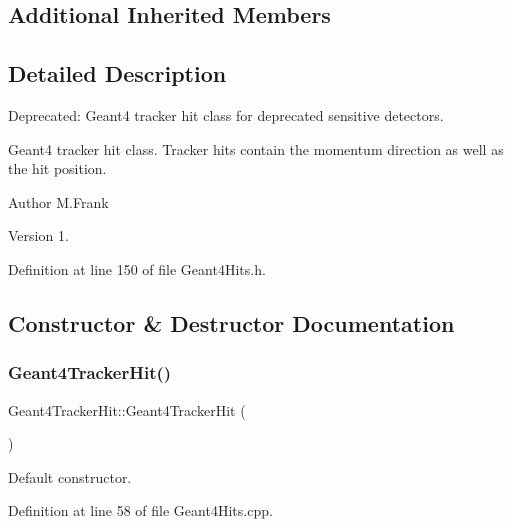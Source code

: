 \subsection*{Additional Inherited Members}


\subsection{Detailed Description}
Deprecated\+: Geant4 tracker hit class for deprecated sensitive detectors. 

Geant4 tracker hit class. Tracker hits contain the momentum direction as well as the hit position.

\begin{DoxyAuthor}{Author}
M.\+Frank 
\end{DoxyAuthor}
\begin{DoxyVersion}{Version}
1. 
\end{DoxyVersion}


Definition at line 150 of file Geant4\+Hits.\+h.



\subsection{Constructor \& Destructor Documentation}
\hypertarget{class_d_d4hep_1_1_simulation_1_1_geant4_tracker_hit_a7642c87408d8d1fc386b297c351747ad}{}\label{class_d_d4hep_1_1_simulation_1_1_geant4_tracker_hit_a7642c87408d8d1fc386b297c351747ad} 
\subsubsection{\texorpdfstring{Geant4\+Tracker\+Hit()}{Geant4TrackerHit()}\hspace{0.1cm}{\footnotesize\ttfamily [1/2]}}
{\footnotesize\ttfamily Geant4\+Tracker\+Hit\+::\+Geant4\+Tracker\+Hit (\begin{DoxyParamCaption}{ }\end{DoxyParamCaption})}



Default constructor. 



Definition at line 58 of file Geant4\+Hits.\+cpp.


